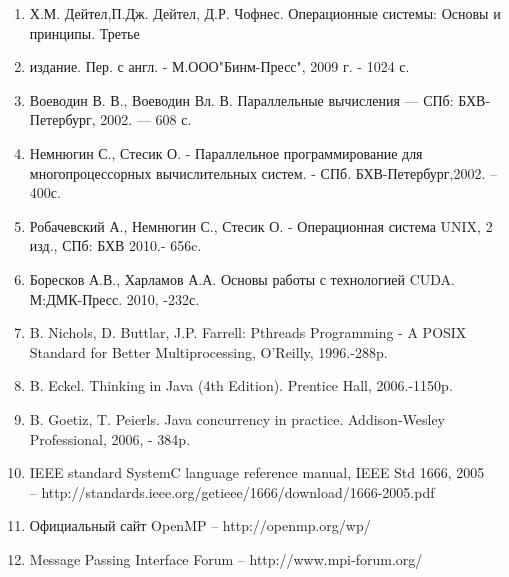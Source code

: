 \documentclass[a4paper, 12pt]{report}		%
\begin{document}
\begin{enumerate}
    \item Х.М. Дейтел,П.Дж. Дейтел, Д.Р. Чофнес. Операционные системы: Основы и принципы. Третье     \item издание. Пер. с англ. - М.ООО"Бинм-Пресс", 2009 г. - 1024 с.
    \item Воеводин В. В., Воеводин Вл. В. Параллельные вычисления — СПб: БХВ-Петербург, 2002. — 608 с.
    \item Немнюгин С., Стесик О. - Параллельное программирование для многопроцессорных вычислительных систем. - СПб. БХВ-Петербург,2002. – 400с.
    \item Робачевский А., Немнюгин С., Стесик О. - Операционная система UNIX, 2 изд., СПб: БХВ 2010.- 656c.
    \item Боресков А.В., Харламов А.А. Основы работы с технологией CUDA. М:ДМК-Пресс. 2010, -232с.
    \item B. Nichols, D. Buttlar, J.P. Farrell: Pthreads Programming - A POSIX Standard for Better Multiprocessing, O'Reilly, 1996.-288p.
    \item B. Eckel. Thinking in Java (4th Edition). Prentice Hall, 2006.-1150p.
    \item B. Goetiz, T. Peierls. Java concurrency in practice. Addison-Wesley Professional, 2006, - 384p.
    \item IEEE standard SystemC language reference manual, IEEE Std 1666, 2005\\ – http://standards.ieee.org/getieee/1666/download/1666-2005.pdf
    \item Официальный сайт OpenMP – http://openmp.org/wp/
    \item Message Passing Interface Forum – http://www.mpi-forum.org/
\end{enumerate}
\end{document}
